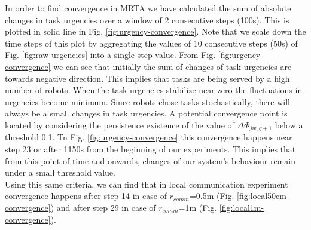 \documentclass[letterpaper, 10 pt, times, conference]{ieeeconf} %
\begin{document}
%
In order to find convergence in MRTA we have calculated the sum of absolute changes in task urgencies over a window of 2 consecutive steps (100s). This is plotted in solid line in Fig. \ref{fig:urgency-convergence}. Note that we scale down the time steps of this plot by aggregating the values of 10 consecutive steps (50s) of Fig. \ref{fig:raw-urgencies} into a single step value.
From Fig. \ref{fig:urgency-convergence} we can see that initially the sum of changes of task urgencies are towards negative direction. This implies that tasks are being served by a high number of robots. When the task urgencies stabilize near zero the fluctuations in urgencies become minimum. Since robots chose tasks stochastically, there will always be a small changes in task urgencies. A potential convergence point is located by considering the persistence existence of the value of $\Delta \Phi_{jw, q+1}$ below a threshold 0.1. Tn Fig. \ref{fig:urgency-convergence} this convergence happens near step 23 or after 1150s from the beginning of our experiments. This implies that from this point of time and onwards, changes of our system's behaviour remain under a small threshold value.\\
Using this same criteria, we can find that in local communication experiment convergence happens after step 14 in case of $r_{comm}$=0.5m (Fig. \ref{fig:local50cm-convergence}) and after step 29 in case of $r_{comm}$=1m (Fig. \ref{fig:local1m-convergence}).\\ 
\end{document}

